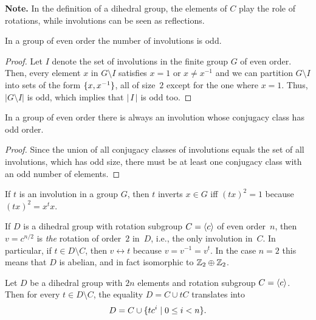 \textbf{Note.} In the definition of a dihedral group, the elements of $C$ play the role of rotations, while involutions can be seen as reflections.

\begin{prop}
    In a group of even order the number of involutions is odd.
\end{prop}

\begin{proof} Let $I$ denote the set of involutions in the finite group $G$ of even order. Then, every element $x$ in $G\setminus I$ satisfies $x=1$ or $x\ne x^{-1}$ and we can partition $G\setminus I$ into sets of the form $\{x,x^{-1}\}$, all of size~$2$ except for the one where $x=1$. Thus, $|G\setminus I|$ is odd, which implies that $|\,I\,|$ is odd too.  \end{proof}

\begin{cor}
    In a group of even order there is always an involution whose conjugacy class has odd order.
\end{cor}

\begin{proof} Since the union of all conjugacy classes of involutions equals the set of all involutions, which has odd size, there must be at least one conjugacy class with an odd number of elements.  \end{proof}

\begin{rem}
    If\/ $t$ is an involution in a group\/ $G$, then\/ $t$ inverts\/ $x\in G$ iff\/ $(tx)^2=1$ because\/ $(tx)^2=x^tx$.
\end{rem}

\begin{rem}\label{rotation-involution}
    If\/ $D$ is a dihedral group with rotation subgroup\/ $C=\langle c\rangle$ of even order\/~$n$, then\/ $v=c^{n/2}$ is \textsl{the} rotation of order\/~$2$ in\/~$D$, i.e., the only involution in\/~$C$. In particular, if\/ $t\in D\setminus C$, then\/ $v\leftrightarrow t$ because\/ $v=v^{-1}=v^t$. In the case\/ $n=2$ this means that\/ $D$ is abelian, and in fact isomorphic to\/ $\mathbb{Z}_2\oplus\mathbb{Z}_2$.
\end{rem}

\begin{rem}\label{dihedral-elements}
    Let\/ $D$ be a dihedral group with\/ $2n$ elements and rotation subgroup\/ $C=\langle c\rangle$. Then for every\/ $t\in D\setminus C$, the equality\/ $D=C\cup tC$ translates into
    $$
        D = C\cup\{tc^i\mid 0\le i< n\}.
    $$
\end{rem}

